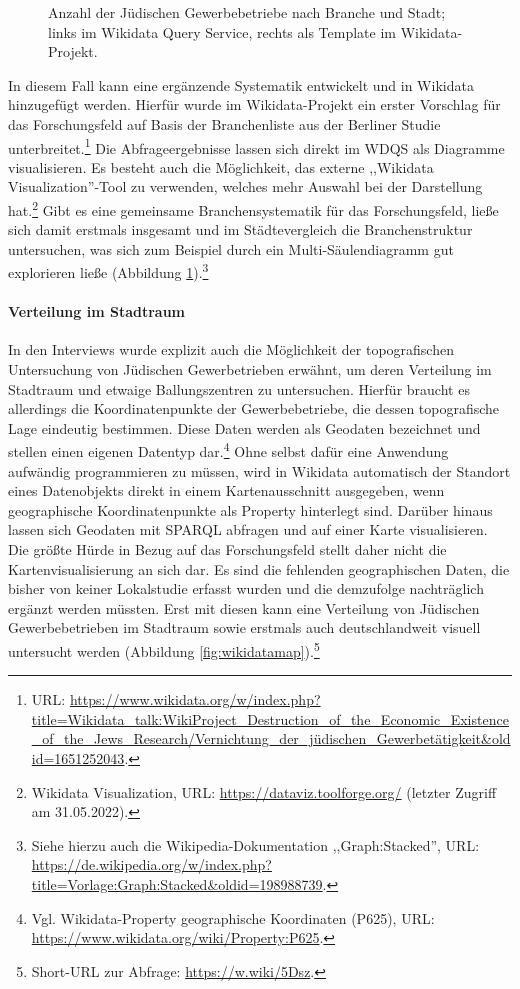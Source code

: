 \begin{figure}[h]
    \centering
    \caption{Anzahl der Jüdischen Gewerbebetriebe nach Branche und Stadt; links im Wikidata Query Service, rechts als Template im Wikidata-Projekt.}
    \label{fig:wikidatacharts}
\end{figure}

In diesem Fall kann eine ergänzende Systematik entwickelt und in Wikidata hinzugefügt werden. Hierfür wurde im Wikidata-Projekt ein erster Vorschlag für das Forschungsfeld auf Basis der Branchenliste aus der Berliner Studie unterbreitet.\footnote{URL: \url{https://www.wikidata.org/w/index.php?title=Wikidata_talk:WikiProject\_Destruction\_of\_the\_Economic\_Existence\_of\_the\_Jews\_Research/Vernichtung\_der\_jüdischen_Gewerbetätigkeit\&oldid=1651252043}.} Die Abfrageergebnisse lassen sich direkt im WDQS als Diagramme visualisieren. Es besteht auch die Möglichkeit, das externe ,,Wikidata Visualization''-Tool zu verwenden, welches mehr Auswahl bei der Darstellung hat.\footnote{Wikidata Visualization, URL: \url{https://dataviz.toolforge.org/} (letzter Zugriff am 31.05.2022).} Gibt es eine gemeinsame Branchensystematik für das Forschungsfeld, ließe sich damit erstmals insgesamt und im Städtevergleich die Branchenstruktur untersuchen, was sich zum Beispiel durch ein Multi-Säulendiagramm gut explorieren ließe (Abbildung \ref{fig:wikidatacharts}).\footnote{Siehe hierzu auch die Wikipedia-Dokumentation ,,Graph:Stacked'', URL: \url{https://de.wikipedia.org/w/index.php?title=Vorlage:Graph:Stacked\&oldid=198988739}.}

\paragraph{Verteilung im Stadtraum}

In den Interviews wurde explizit auch die Möglichkeit der topografischen Untersuchung von Jüdischen Gewerbetrieben erwähnt, um deren Verteilung im Stadtraum und etwaige Ballungszentren zu untersuchen. Hierfür braucht es allerdings die Koordinatenpunkte der Gewerbebetriebe, die dessen topografische Lage eindeutig bestimmen. Diese Daten werden als Geodaten bezeichnet und stellen einen eigenen Datentyp dar.\footnote{Vgl. Wikidata-Property geographische Koordinaten (P625), URL: \url{https://www.wikidata.org/wiki/Property:P625}.} Ohne selbst dafür eine Anwendung aufwändig programmieren zu müssen, wird in Wikidata automatisch der Standort eines Datenobjekts direkt in einem Kartenausschnitt ausgegeben, wenn geographische Koordinatenpunkte als Property hinterlegt sind. Darüber hinaus lassen sich Geodaten mit SPARQL abfragen und auf einer Karte visualisieren. Die größte Hürde in Bezug auf das Forschungsfeld stellt daher nicht die Kartenvisualisierung an sich dar. Es sind die fehlenden geographischen Daten, die bisher von keiner Lokalstudie erfasst wurden und die demzufolge nachträglich ergänzt werden müssten. Erst mit diesen kann eine Verteilung von Jüdischen Gewerbebetrieben im Stadtraum sowie erstmals auch deutschlandweit visuell untersucht werden (Abbildung \ref{fig:wikidatamap}).\footnote{Short-URL zur Abfrage: \url{https://w.wiki/5Dsz}.}

